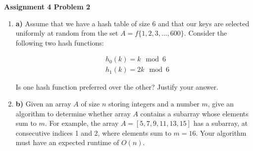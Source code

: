 \documentclass[12pt]{article}
\begin{document}
	
	\begin{center}
		
		{\Large\bf Assignment 4 Problem 2}\\
		\vspace{3mm}
	\end{center}
	
	\def\question#1{\item[\bf #1.]}
	\def\part#1{\item[\bf #1)]}
	\newcommand{\pc}[1]{\mbox{\textbf{#1}}} %
	
	
	
	\begin{enumerate}
		\part{a} Assume that we have a hash table of size 6 and that our keys are selected uniformly at random from the set $A = f\{1, 2, 3, \ldots, 600\}$. Consider the following two hash functions:
		\begin{center}
			$$\begin{aligned}
				& h_0(k) = k \mod 6 \\
				& h_1(k) = 2k \mod 6 
			\end{aligned}$$
		\end{center}
		
		Is one hash function preferred over the other? Justify your answer.
		
		\part{b} Given an array $A$ of size $n$ storing integers and a number $m$, give an algorithm to determine whether array $A$ contains a subarray whose elements sum to $m$.  
		For example, the array $A = [5, 7, 9, 11, 13, 15]$ has a subarray, at consecutive indices 1 and 2, where elements sum to $m=16$.
		Your algorithm must have an expected runtime of $O(n)$.
		
	\end{enumerate}
	
\end{document}
